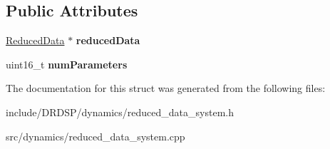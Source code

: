 \subsection*{Public Attributes}
\begin{DoxyCompactItemize}
\item 
\hypertarget{struct_d_r_d_s_p_1_1_reduced_data_system_a0a04590789144be3af1cab48ff813c81}{\hyperlink{struct_d_r_d_s_p_1_1_reduced_data}{Reduced\-Data} $\ast$ {\bfseries reduced\-Data}}\label{struct_d_r_d_s_p_1_1_reduced_data_system_a0a04590789144be3af1cab48ff813c81}

\item 
\hypertarget{struct_d_r_d_s_p_1_1_reduced_data_system_a6c869c5a4c0f4346d1c9717ee0667f26}{uint16\-\_\-t {\bfseries num\-Parameters}}\label{struct_d_r_d_s_p_1_1_reduced_data_system_a6c869c5a4c0f4346d1c9717ee0667f26}

\end{DoxyCompactItemize}


The documentation for this struct was generated from the following files\-:\begin{DoxyCompactItemize}
\item 
include/\-D\-R\-D\-S\-P/dynamics/reduced\-\_\-data\-\_\-system.\-h\item 
src/dynamics/reduced\-\_\-data\-\_\-system.\-cpp\end{DoxyCompactItemize}
